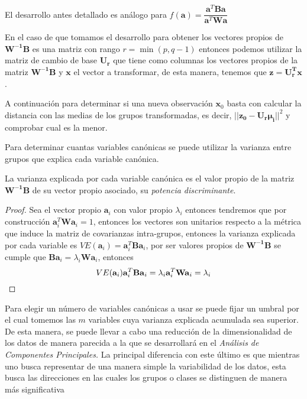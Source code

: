\begin{propo}
El desarrollo antes detallado es análogo para $f(\textbf{a})=\dfrac{\textbf{a}^T \textbf{B}\textbf{a}}{\textbf{a}^T \textbf{W}\textbf{a}}$
\end{propo}

\noindent En el caso de que tomamos el desarrollo para obtener los vectores propios de $\mathbf{W^{-1}B}$ es una matriz con rango $r=\min(p,q-1)$ entonces podemos utilizar la matriz de cambio de base $\mathbf{U_r}$ que tiene como columnas los vectores propios de la matriz $\mathbf{W^{-1}B}$ y $\mathbf{x}$ el vector a transformar, de esta manera, tenemos que $\mathbf{z=U_r^T x}$.

\noindent A continuación para determinar si una nueva observación $\mathbf{x}_0$ basta con calcular la distancia con las medias de los grupos transformadas, es decir, $||\mathbf{z_0-U_r\mu_i}||^2$ y comprobar cual es la menor. 

\noindent Para determinar cuantas variables canónicas se puede utilizar la varianza entre grupos que explica cada variable canónica. 

\begin{propo}
La varianza explicada por cada variable canónica es el valor propio de la matriz $\mathbf{W^{-1} B}$ de su vector propio asociado, su \emph{potencia discriminante}. 
\begin{proof}
Sea el vector propio $\textbf{a}_i$ con valor propio $\lambda_i$ entonces tendremos que por construcción $\mathbf{a}_i^T \mathbf{W a}_i=1$, entonces los vectores son unitarios respecto a la métrica que induce la matriz de covarianzas intra-grupos, entonces la varianza explicada por cada variable es $VE(\textbf{a}_i)=\mathbf{a}_i^T\mathbf{Ba}_i$, por ser valores propios de $\mathbf{W^{-1}B}$ se cumple que $\mathbf{Ba}_i=\lambda_i \mathbf{W a}_i$, entonces
\begin{equation}
VE(\textbf{a}_i)\mathbf{a}_i^T\mathbf{Ba}_i=\lambda_i \mathbf{a}_i^T\mathbf{Wa}_i=\lambda_i\qedhere
\end{equation}
\end{proof}
\end{propo}

\noindent Para elegir un número de variables canónicas a usar se puede fijar un umbral por el cual tomemos las $m$ variables cuya varianza explicada acumulada sea superior. De esta manera, se puede llevar a cabo una reducción de la dimensionalidad de los datos de manera parecida a la que se desarrollará en el \emph{Análisis de Componentes Principales.} La principal diferencia con este último es que mientras uno busca representar de una manera simple la variabilidad de los datos, esta busca las direcciones en las cuales los grupos o clases se distinguen de manera más significativa